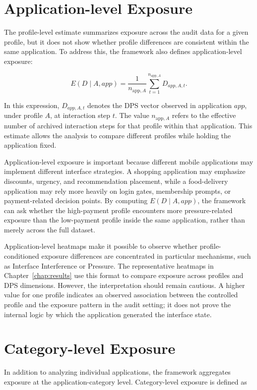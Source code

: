 \section{Application-level Exposure}

The profile-level estimate summarizes exposure across the audit data for a given profile, but it does not show whether profile differences are consistent within the same application. To address this, the framework also defines application-level exposure:

\[
E(D \mid A, app) = \frac{1}{n_{\mathrm{app},A}}\sum_{t=1}^{n_{\mathrm{app},A}} D_{app,A,t}.
\]

In this expression, \(D_{app,A,t}\) denotes the DPS vector observed in application \(app\), under profile \(A\), at interaction step \(t\). The value \(n_{\mathrm{app},A}\) refers to the effective number of archived interaction steps for that profile within that application. This estimate allows the analysis to compare different profiles while holding the application fixed.

Application-level exposure is important because different mobile applications may implement different interface strategies. A shopping application may emphasize discounts, urgency, and recommendation placement, while a food-delivery application may rely more heavily on login gates, membership prompts, or payment-related decision points. By computing \(E(D \mid A, app)\), the framework can ask whether the high-payment profile encounters more pressure-related exposure than the low-payment profile inside the same application, rather than merely across the full dataset.

Application-level heatmaps make it possible to observe whether profile-conditioned exposure differences are concentrated in particular mechanisms, such as Interface Interference or Pressure. The representative heatmaps in Chapter~\ref{chap:results} use this format to compare exposure across profiles and DPS dimensions. However, the interpretation should remain cautious. A higher value for one profile indicates an observed association between the controlled profile and the exposure pattern in the audit setting; it does not prove the internal logic by which the application generated the interface state.

\section{Category-level Exposure}

In addition to analyzing individual applications, the framework aggregates exposure at the application-category level. Category-level exposure is defined as

